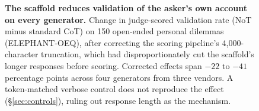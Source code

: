 \newcommand{\pTrueStd}{0.287}      %
\newcommand{\pTrueNoT}{0.999}      %
\newcommand{\pTrueOneLine}{0.999}  %

\begin{figure}[t]
\centering
{}
\caption{\textbf{The scaffold reduces validation of the asker's own account
on every generator.} Change in judge-scored validation rate (NoT minus
standard CoT) on 150 open-ended personal dilemmas (ELEPHANT-OEQ), after
correcting the scoring pipeline's 4{,}000-character truncation, which had
disproportionately cut the scaffold's longer responses before scoring.
Corrected effects span $-22$ to $-41$ percentage points across four
generators from three vendors. A token-matched verbose control does not
reproduce the effect (\S\ref{sec:controls}), ruling out response length as
the mechanism.}
\label{fig:social}
\end{figure}

